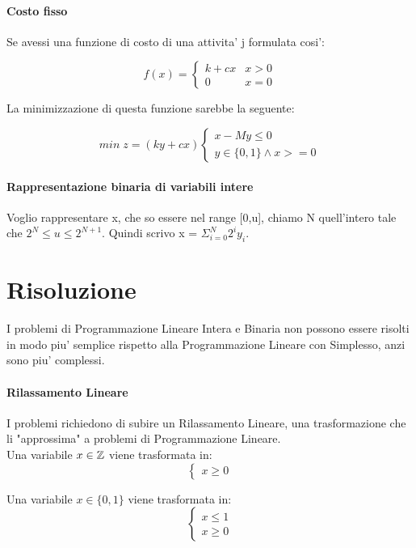\paragraph{Costo fisso}

Se avessi una funzione di costo di una attivita' j formulata cosi':

\[
    f(x) = 
    \begin{cases}
        k + cx & x > 0\\
        0 & x = 0
    \end{cases}
\]

La minimizzazione di questa funzione sarebbe la seguente:

\[
    min \; z = (ky + cx)
    \begin{cases}
        x - My \leq 0 \\
        y \in \{0,1\} \land x >= 0
    \end{cases}
\]

\paragraph{Rappresentazione binaria di variabili intere}

Voglio rappresentare x, che so essere nel range [0,u], chiamo N quell'intero tale che $2^N \leq u \leq 2^{N+1}$.
Quindi scrivo x = $\Sigma ^N _{i=0} 2^i y_i$.

\section{Risoluzione}

I problemi di Programmazione Lineare Intera e Binaria non possono essere risolti in modo piu' semplice rispetto alla Programmazione Lineare con Simplesso, anzi sono piu' complessi.

\paragraph{Rilassamento Lineare}

I problemi richiedono di subire un Rilassamento Lineare, una trasformazione che li "approssima" a problemi di Programmazione Lineare. \\

Una variabile $x \in \mathbb{Z}$ viene trasformata in:
\[
    \begin{cases}
    x \geq 0
    \end{cases}
\]

Una variabile $x \in \{0,1\}$ viene trasformata in:
\[
    \begin{cases}
        x \leq 1 \\
        x \geq 0
    \end{cases}
\]

